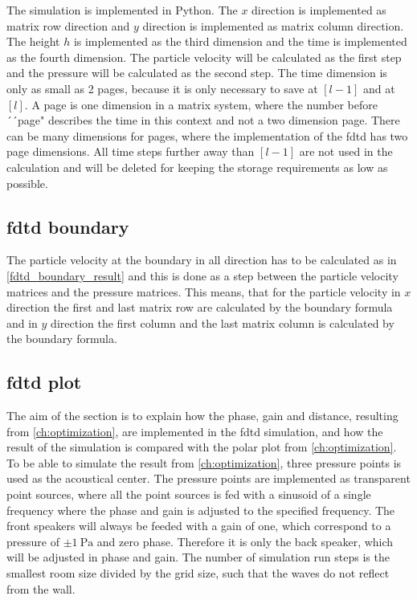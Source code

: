 The simulation is implemented in Python. The $x$ direction is implemented as matrix row direction and $y$ direction is implemented as matrix column direction. The height $h$ is implemented as the third dimension and the time is implemented as the fourth dimension. The particle velocity will be calculated as the first step and the pressure will be calculated as the second step. The time dimension is only as small as 2 pages, because it is only necessary to save at $[l-1]$ and at $[l]$. A page is one dimension in a matrix system, where the number before ´´page"  describes the time in this context and not a two dimension page. There can be many dimensions for pages, where the implementation of the \gls{fdtd} has two page dimensions.  All time steps further away than $[l-1]$ are not used in the calculation and will be deleted for keeping the storage requirements as low as possible. 

\subsection{\gls{fdtd} boundary}
The particle velocity at the boundary in all direction has to be calculated as in \autoref{fdtd_boundary_result} and this is done as a step between the particle velocity matrices and the pressure matrices. This means, that for the particle velocity in $x$ direction the first and last matrix row are calculated by the boundary formula and in $y$ direction the first column and the last matrix column is calculated by the boundary formula. 


\subsection{\gls{fdtd} plot}
The aim of the section is to explain how the phase, gain and distance, resulting from \autoref{ch:optimization}, are implemented in the \gls{fdtd} simulation, and how the result of the simulation is compared with the polar plot from \autoref{ch:optimization}. \\

To be able to simulate the result from \autoref{ch:optimization}, three pressure points is used as the acoustical center. The pressure points are implemented as transparent point sources, where all the point sources is fed with a sinusoid of a single frequency where the phase and gain is adjusted to the specified frequency. The front speakers will always be feeded with a gain of one, which correspond to a pressure of $\pm \SI{1}{\pascal}$ and zero phase. Therefore it is only the back speaker, which will be adjusted in phase and gain. The number of simulation run steps is the smallest room size divided by the grid size, such that the waves do not reflect from the wall. \\

